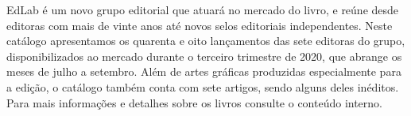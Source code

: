 \blankpage

\pagestyle{indice}

\vspace*{.5cm}

{}

\vspace{2.2cm}

{}


\hspace*{-7cm}\hrulefill\hspace*{-7cm}

\vspace{1cm}

\hspace*{-.5cm}\parbox{150pt}{\raggedright EdLab é um novo grupo editorial que atuará no mercado do livro, e reúne desde editoras com mais de vinte anos até novos selos editoriais independentes. Neste catálogo apresentamos os quarenta e oito lançamentos das sete editoras do grupo, disponibilizados ao mercado durante o terceiro trimestre de 2020, que abrange os meses de julho a setembro. Além de artes gráficas produzidas especialmente para a edição, o catálogo também conta com sete artigos, sendo alguns deles inéditos. Para mais informações e detalhes sobre os livros consulte o conteúdo interno.} %

